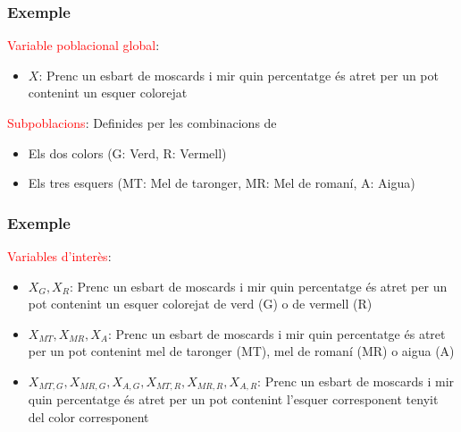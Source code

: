\documentclass[12pt,t]{beamer}
\newcommand{\red}[1]{\textcolor{red}{#1}}
\theoremstyle{plain}
\theoremstyle{definition}
\begin{document}
\begin{frame}
\frametitle{Exemple}


\red{Variable poblacional global}: \medskip

\begin{itemize}
\item $X$: Prenc un esbart de moscards i mir quin percentatge és atret per un pot contenint un esquer colorejat\medskip
\end{itemize}

\red{Subpoblacions}: Definides per les combinacions de \medskip

\begin{itemize}
\item Els dos colors (G: Verd, R: Vermell)\medskip

\item Els tres esquers (MT: Mel de taronger, MR: Mel de romaní, A: Aigua)
\end{itemize}
\end{frame}


\begin{frame}
\frametitle{Exemple}

\red{Variables d'interès}: \medskip

\begin{itemize}
\item $X_{G},X_{R}$: Prenc un esbart de moscards i mir quin percentatge és atret per un pot contenint un esquer colorejat de verd (G) o de vermell (R)\medskip

\item $X_{MT},X_{MR},X_A$: Prenc un esbart de moscards i mir quin percentatge és atret per un pot contenint mel de taronger (MT),  mel de romaní (MR) o aigua (A)\medskip

\item $X_{MT,G},X_{MR,G},X_{A,G},X_{MT,R},X_{MR,R},X_{A,R}$: Prenc un esbart de moscards i mir quin percentatge és atret per un pot contenint l'esquer corresponent tenyit del color corresponent
\end{itemize}
\end{frame}
\end{document}
